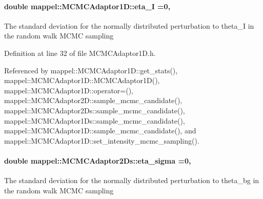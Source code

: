 \paragraph[{\texorpdfstring{eta\+\_\+I}{eta_I}}]{\setlength{\rightskip}{0pt plus 5cm}double mappel\+::\+M\+C\+M\+C\+Adaptor1\+D\+::eta\+\_\+I =0\hspace{0.3cm}{\ttfamily [protected]}, {\ttfamily [inherited]}}\hypertarget{classmappel_1_1MCMCAdaptor1D_a5780d326be0c40e10d6c91777cfffbd3}{}\label{classmappel_1_1MCMCAdaptor1D_a5780d326be0c40e10d6c91777cfffbd3}
The standard deviation for the normally distributed perturbation to theta\+\_\+I in the random walk M\+C\+MC sampling 

Definition at line 32 of file M\+C\+M\+C\+Adaptor1\+D.\+h.



Referenced by mappel\+::\+M\+C\+M\+C\+Adaptor1\+D\+::get\+\_\+stats(), mappel\+::\+M\+C\+M\+C\+Adaptor1\+D\+::\+M\+C\+M\+C\+Adaptor1\+D(), mappel\+::\+M\+C\+M\+C\+Adaptor1\+D\+::operator=(), mappel\+::\+M\+C\+M\+C\+Adaptor2\+D\+::sample\+\_\+mcmc\+\_\+candidate(), mappel\+::\+M\+C\+M\+C\+Adaptor2\+Ds\+::sample\+\_\+mcmc\+\_\+candidate(), mappel\+::\+M\+C\+M\+C\+Adaptor1\+Ds\+::sample\+\_\+mcmc\+\_\+candidate(), mappel\+::\+M\+C\+M\+C\+Adaptor1\+D\+::sample\+\_\+mcmc\+\_\+candidate(), and mappel\+::\+M\+C\+M\+C\+Adaptor1\+D\+::set\+\_\+intensity\+\_\+mcmc\+\_\+sampling().

\paragraph[{\texorpdfstring{eta\+\_\+sigma}{eta_sigma}}]{\setlength{\rightskip}{0pt plus 5cm}double mappel\+::\+M\+C\+M\+C\+Adaptor2\+Ds\+::eta\+\_\+sigma =0\hspace{0.3cm}{\ttfamily [protected]}, {\ttfamily [inherited]}}\hypertarget{classmappel_1_1MCMCAdaptor2Ds_ae5305087fd5abee9b38324be42d57a70}{}\label{classmappel_1_1MCMCAdaptor2Ds_ae5305087fd5abee9b38324be42d57a70}
The standard deviation for the normally distributed perturbation to theta\+\_\+bg in the random walk M\+C\+MC sampling 

